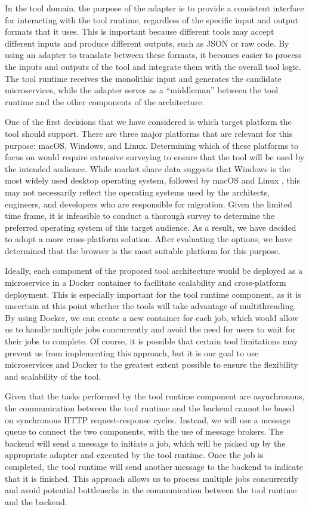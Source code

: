 \documentclass[conference]{IEEEtran}
\begin{document}
In the tool domain, the purpose of the adapter is to provide a consistent
interface for interacting with the tool runtime, regardless of the specific
input and output formats that it uses. This is important because different
tools may accept different inputs and produce different outputs, such as JSON
or raw code. By using an adapter to translate between these formats, it becomes
easier to process the inputs and outputs of the tool and integrate them with
the overall tool logic. The tool runtime receives the monolithic input and
generates the candidate microservices, while the adapter serves as a
``middleman'' between the tool runtime and the other components of the
architecture.

One of the first decisions that we have considered is which target platform the
tool should support. There are three major platforms that are relevant for this
purpose: macOS, Windows, and Linux. Determining which of these platforms to
focus on would require extensive surveying to ensure that the tool will be used
by the intended audience. While market share data suggests that Windows is the
most widely used desktop operating system, followed by macOS and Linux
\cite{desktop-usage-worldwide}, this may not necessarily reflect the operating
systems used by the architects, engineers, and developers who are responsible
for migration. Given the limited time frame, it is infeasible to conduct a
thorough survey to determine the preferred operating system of this target
audience. As a result, we have decided to adopt a more cross-platform solution.
After evaluating the options, we have determined that the browser is the most
suitable platform for this purpose.

Ideally, each component of the proposed tool architecture would be deployed as
a microservice in a Docker container to facilitate scalability and
cross-platform deployment. This is especially important for the tool runtime
component, as it is uncertain at this point whether the tools will take
advantage of multithreading. By using Docker, we can create a new container for
each job, which would allow us to handle multiple jobs concurrently and avoid
the need for users to wait for their jobs to complete. Of course, it is
possible that certain tool limitations may prevent us from implementing this
approach, but it is our goal to use microservices and Docker to the greatest
extent possible to ensure the flexibility and scalability of the tool.

Given that the tasks performed by the tool runtime component are asynchronous,
the communication between the tool runtime and the backend cannot be based on
synchronous HTTP request-response cycles. Instead, we will use a message queue
to connect the two components, with the use of message brokers. The backend
will send a message to initiate a job, which will be picked up by the
appropriate adapter and executed by the tool runtime. Once the job is
completed, the tool runtime will send another message to the backend to
indicate that it is finished. This approach allows us to process multiple jobs
concurrently and avoid potential bottlenecks in the communication between the
tool runtime and the backend.
\end{document}
